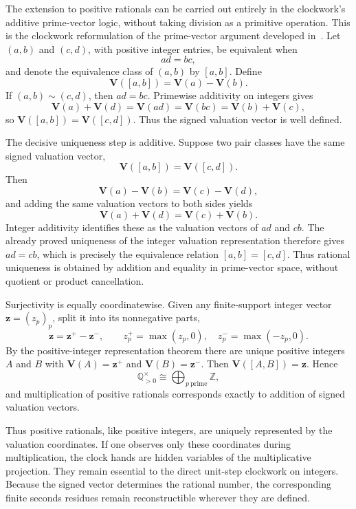 \documentclass[11pt,a4paper]{article}
\theoremstyle{clockplain}
\theoremstyle{definition}
\theoremstyle{remark}
\newcommand{\Q}{\mathbb Q}
\newcommand{\Z}{\mathbb Z}
\newcommand{\V}{\mathbf V}
\begin{document}
The extension to positive rationals can be carried out entirely in the clockwork's additive prime-vector logic, without taking division as a primitive operation. This is the clockwork reformulation of the prime-vector argument developed in~\cite{EmmerichPrimeVectors2025}. Let $(a,b)$ and $(c,d)$, with positive integer entries, be equivalent when
\[
ad=bc,
\]
and denote the equivalence class of $(a,b)$ by $[a,b]$. Define
\begin{equation}
\boxed{\V([a,b])=\V(a)-\V(b).}
\label{eq:rational-pair-vector}
\end{equation}
If $(a,b)\sim(c,d)$, then $ad=bc$. Primewise additivity on integers gives
\[
\V(a)+\V(d)=\V(ad)=\V(bc)=\V(b)+\V(c),
\]
so $\V([a,b])=\V([c,d])$. Thus the signed valuation vector is well defined.

The decisive uniqueness step is additive. Suppose two pair classes have the same signed valuation vector,
\[
\V([a,b])=\V([c,d]).
\]
Then
\[
\V(a)-\V(b)=\V(c)-\V(d),
\]
and adding the same valuation vectors to both sides yields
\[
\V(a)+\V(d)=\V(c)+\V(b).
\]
Integer additivity identifies these as the valuation vectors of $ad$ and $cb$. The already proved uniqueness of the integer valuation representation therefore gives $ad=cb$, which is precisely the equivalence relation $[a,b]=[c,d]$. Thus rational uniqueness is obtained by addition and equality in prime-vector space, without quotient or product cancellation.

Surjectivity is equally coordinatewise. Given any finite-support integer vector $\mathbf z=(z_p)_p$, split it into its nonnegative parts,
\[
\mathbf z=\mathbf z^{+}-\mathbf z^{-},
\qquad z_p^{+}=\max(z_p,0),\quad z_p^{-}=\max(-z_p,0).
\]
By the positive-integer representation theorem there are unique positive integers $A$ and $B$ with $\V(A)=\mathbf z^{+}$ and $\V(B)=\mathbf z^{-}$. Then $\V([A,B])=\mathbf z$. Hence
\begin{equation}
\boxed{\Q_{>0}^{\times}\cong\bigoplus_{p\ \mathrm{prime}}\Z,}
\label{eq:rational-clock-bijection}
\end{equation}
and multiplication of positive rationals corresponds exactly to addition of signed valuation vectors.

Thus positive rationals, like positive integers, are uniquely represented by the valuation coordinates. If one observes only these coordinates during multiplication, the clock hands are hidden variables of the multiplicative projection. They remain essential to the direct unit-step clockwork on integers. Because the signed vector determines the rational number, the corresponding finite seconds residues remain reconstructible wherever they are defined.
\end{document}

